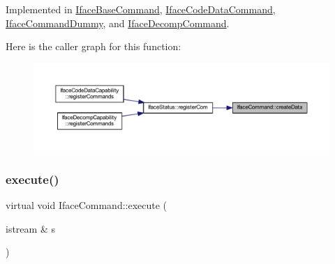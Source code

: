 Implemented in \mbox{\hyperlink{class_iface_base_command_aa9084b1ec06e7bd05b88a89303fd42a4}{Iface\+Base\+Command}}, \mbox{\hyperlink{class_iface_code_data_command_a1ab8f8101f822cb726bca9e326fd5980}{Iface\+Code\+Data\+Command}}, \mbox{\hyperlink{class_iface_command_dummy_aa386a0965e95c4b2f6808a79cda853d6}{Iface\+Command\+Dummy}}, and \mbox{\hyperlink{class_iface_decomp_command_a9a4c2fccea348fbb80dc363dc6a39853}{Iface\+Decomp\+Command}}.

Here is the caller graph for this function\+:
\nopagebreak
\begin{figure}[H]
\begin{center}
\leavevmode
\includegraphics[width=350pt]{class_iface_command_a908e484baf6e090b46ceb2ccaea8139d_icgraph}
\end{center}
\end{figure}
\mbox{\label{class_iface_command_af10e29cee2c8e419de6efe9e680ad201}} 
\subsubsection{\texorpdfstring{execute()}{execute()}}
{\footnotesize\ttfamily virtual void Iface\+Command\+::execute (\begin{DoxyParamCaption}\item[{istream \&}]{s }\end{DoxyParamCaption})\hspace{0.3cm}{\ttfamily [pure virtual]}}



